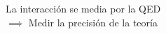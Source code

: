 \documentclass[preview]{standalone}
\begin{document}
\begin{center}
\begin{flushleft}La interacción se media por la QED \\ $\implies$ Medir la precisión de la teoría\end{flushleft}
\end{center}
\end{document}
